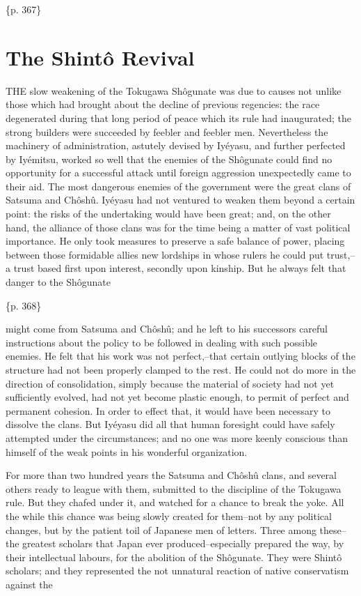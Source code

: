 \{p. 367\}

\section{The Shintô Revival}
\label{sec:org42c7e91}

THE slow weakening of the Tokugawa Shôgunate was due to causes not unlike those which had brought about the decline of previous regencies: the race degenerated during that long period of peace which its rule had inaugurated; the strong builders were succeeded by feebler and feebler men. Nevertheless the machinery of administration, astutely devised by Iyéyasu, and further perfected by Iyémitsu, worked so well that the enemies of the Shôgunate could find no opportunity for a successful attack until foreign aggression unexpectedly came to their aid. The most dangerous enemies of the government were the great clans of Satsuma and Chôshû. Iyéyasu had not ventured to weaken them beyond a certain point: the risks of the undertaking would have been great; and, on the other hand, the alliance of those clans was for the time being a matter of vast political importance. He only took measures to preserve a safe balance of power, placing between those formidable allies new lordships in whose rulers he could put trust,--a trust based first upon interest, secondly upon kinship. But he always felt that danger to the Shôgunate

\{p. 368\}

might come from Satsuma and Chôshû; and he left to his successors careful instructions about the policy to be followed in dealing with such possible enemies. He felt that his work was not perfect,--that certain outlying blocks of the structure had not been properly clamped to the rest. He could not do more in the direction of consolidation, simply because the material of society had not yet sufficiently evolved, had not yet become plastic enough, to permit of perfect and permanent cohesion. In order to effect that, it would have been necessary to dissolve the clans. But Iyéyasu did all that human foresight could have safely attempted under the circumstances; and no one was more keenly conscious than himself of the weak points in his wonderful organization.

For more than two hundred years the Satsuma and Chôshû clans, and several others ready to league with them, submitted to the discipline of the Tokugawa rule. But they chafed under it, and watched for a chance to break the yoke. All the while this chance was being slowly created for them--not by any political changes, but by the patient toil of Japanese men of letters. Three among these--the greatest scholars that Japan ever produced--especially prepared the way, by their intellectual labours, for the abolition of the Shôgunate. They were Shintô scholars; and they represented the not unnatural reaction of native conservatism against the

